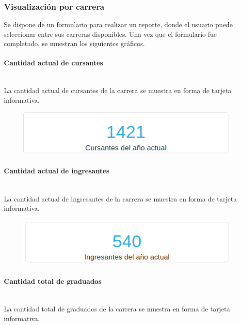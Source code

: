 \subsubsection{Visualización por carrera}

Se dispone de un formulario para realizar un reporte, donde el usuario puede seleccionar entre sus carreras disponibles. Una vez que el formulario fue completado, se muestran los siguientes gráficos.

\paragraph{Cantidad actual de cursantes} \mbox{}\\
La cantidad actual de cursantes de la carrera se muestra en forma de tarjeta informativa.

\begin{figure}[!htbp]
  \centering
    \includegraphics[scale=0.4]{images/seguimiento-academico/sa-cursantes.png}
  \label{fig:sa-cursantes}
\end{figure}

\paragraph{Cantidad actual de ingresantes} \mbox{}\\
La cantidad actual de ingresantes de la carrera se muestra en forma de tarjeta informativa.

\begin{figure}[!htbp]
  \centering
    \includegraphics[scale=0.4]{images/seguimiento-academico/sa-ingresantes.png}
  \label{fig:sa-ingresantes}
\end{figure}

\paragraph{Cantidad total de graduados} \mbox{}\\
La cantidad total de graduados de la carrera se muestra en forma de tarjeta informativa.

